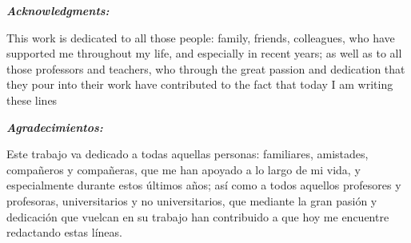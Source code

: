 {}
\newpage

\begin{center}
\noindent
\textbf{\emph{\Large Acknowledgments:}}
\vspace{4cm}
\end{center}

This work is dedicated to all those people: family, friends, colleagues, who have supported me throughout my life, and especially in recent years; as well as to all those professors and teachers, who through the great passion and dedication that they pour into their work have contributed to the fact that today I am writing these lines

\newpage
\afterpage{\blankpage}
\newpage


\begin{center}
\noindent
\textbf{\emph{\Large Agradecimientos:}}
\vspace{4cm}
\end{center}

Este trabajo va dedicado a todas aquellas personas: familiares, amistades, compañeros y compañeras, que me han apoyado a lo largo de mi vida, y especialmente durante estos últimos años; así como a todos aquellos profesores y profesoras, universitarios y no universitarios, que mediante la gran pasión y dedicación que vuelcan en su trabajo han contribuido a que hoy me encuentre redactando estas líneas.

\afterpage{\blankpage}
